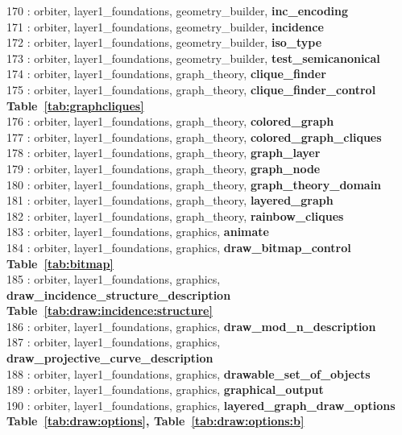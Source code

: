 170 : orbiter, layer1\_foundations, geometry\_builder, {\bf inc\_encoding}\\
171 : orbiter, layer1\_foundations, geometry\_builder, {\bf incidence}\\
172 : orbiter, layer1\_foundations, geometry\_builder, {\bf iso\_type}\\
173 : orbiter, layer1\_foundations, geometry\_builder, {\bf test\_semicanonical}\\
174 : orbiter, layer1\_foundations, graph\_theory, {\bf clique\_finder}\\
175 : orbiter, layer1\_foundations, graph\_theory, {\bf clique\_finder\_control Table~\ref{tab:graphcliques}}\\
176 : orbiter, layer1\_foundations, graph\_theory, {\bf colored\_graph}\\
177 : orbiter, layer1\_foundations, graph\_theory, {\bf colored\_graph\_cliques}\\
178 : orbiter, layer1\_foundations, graph\_theory, {\bf graph\_layer}\\
179 : orbiter, layer1\_foundations, graph\_theory, {\bf graph\_node}\\
180 : orbiter, layer1\_foundations, graph\_theory, {\bf graph\_theory\_domain}\\
181 : orbiter, layer1\_foundations, graph\_theory, {\bf layered\_graph}\\
182 : orbiter, layer1\_foundations, graph\_theory, {\bf rainbow\_cliques}\\
183 : orbiter, layer1\_foundations, graphics, {\bf animate}\\
184 : orbiter, layer1\_foundations, graphics, {\bf draw\_bitmap\_control Table~\ref{tab:bitmap}}\\
185 : orbiter, layer1\_foundations, graphics, {\bf draw\_incidence\_structure\_description Table~\ref{tab:draw:incidence:structure}}\\
186 : orbiter, layer1\_foundations, graphics, {\bf draw\_mod\_n\_description}\\
187 : orbiter, layer1\_foundations, graphics, {\bf draw\_projective\_curve\_description}\\
188 : orbiter, layer1\_foundations, graphics, {\bf drawable\_set\_of\_objects}\\
189 : orbiter, layer1\_foundations, graphics, {\bf graphical\_output}\\
190 : orbiter, layer1\_foundations, graphics, {\bf layered\_graph\_draw\_options Table~\ref{tab:draw:options},  Table~\ref{tab:draw:options:b}}\\
